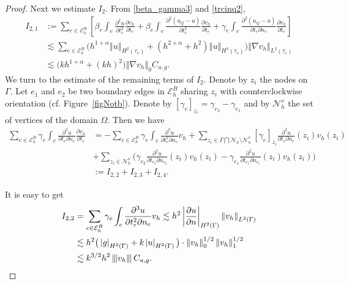 \documentclass[leqno,final]{siamltex}
\numberwithin{equation}{section}
\newcommand{\norm}[1]{\left\Vert#1\right\Vert}
\newcommand{\norme}[1]{\left\Vert{\hskip -2.7pt}\left\vert #1 \right\vert{\hskip -2.7pt}\right\Vert}
\newcommand{\abs}[1]{\left\vert#1\right\vert}
\newcommand{\jm}[1]{\left[#1\right]}
\newcommand{\nn}{\nonumber}
\newcommand{\ls}{\lesssim}
\newcommand{\al}{\alpha}
\newcommand{\be}{\beta}
\newcommand{\ga}{\gamma}
\newcommand{\Ga}{\Gamma}
\newcommand{\na}{\nabla}
\newcommand{\Om}{\Omega}
\newcommand{\pa}{\partial}
\newcommand{\N}{\mathcal{N}}
\newcommand{\E}{\mathcal{E}}
\newcommand{\eq}[1]{\begin{align}#1\end{align}}
\begin{document}
\begin{proof}
Next we estimate $I_2$. From \eqref{beta_gamma3} and \eqref{trcinq2},
\eq{
I_{2,1} &:= \sum_{e\in\E_h^B} \left[ \be_e\int_e\frac{\pa^2 u}{\pa t_e^2}\frac{\pa v_h}{\pa t_e} + \be_e\int_e\frac{\pa^2 (u_Q-u)}{\pa t_e^2}\frac{\pa v_h}{\pa t_e} + \ga_e \int_e\frac{\pa^2 (u_Q-u)}{\pa t_e \pa n_e}\frac{\pa v_h}{\pa t_e}\right]\label{part1_I2}\\
&\ls \sum_{e\in\E_h^B} \big( h^{1+\al}\norm{u}_{H^2(\tau_e)}+(h^{2+\al}+h^2)\norm{u}_{H^3(\tau_e)} \big) \norm{\na v_h}_{L^2(\tau_e)}\nn\\
&\ls \big( kh^{1+\al}+(kh)^{2} \big)\norm{\na v_h}_0  C_{u,g}.\nn
}
We turn to the estimate of the remaining terms of $I_2$. Denote by $z_i$ the nodes on $\Ga$. Let $e_1$ and $e_2$ be two boundary edges in $\E_h^B$ sharing $z_i$ with counterclockwise orientation (cf. Figure~\ref{figNotb}). Denote by $\jm{\ga_e}_{z_i}=\ga_{e_2}-\ga_{e_1}$ and by $\N_h^v$ the set of vertices of the domain $\Om$. Then we have
\eq{
\sum_{e\in\E_h^B}\ga_e\int_e\frac{\pa^2 u}{\pa t_e \pa n_e}\frac{\pa v_h}{\pa t_e} &=  -  \sum_{e\in\E_h^B}\ga_e\int_e\frac{\pa^3 u}{\pa t_e^2 \pa n_e}v_h + \sum_{z_i\in\Ga\bigcap\N_h\setminus\N_h^v} \jm{\ga_e}_{z_i} \frac{\pa^2 u}{\pa t_e \pa n_e}(z_i) v_h(z_i) \label{part20_I2} \\
& + \sum_{z_i\in\N_h^v} \bigg( \ga_{e_2} \frac{\pa^2 u}{\pa t_{e_2} \pa n_{e_2}}(z_i) v_h(z_i) - \ga_{e_1} \frac{\pa^2 u}{\pa t_{e_1} \pa n_{e_1}}(z_i) v_h(z_i) \bigg)\nn\\
&:= I_{2,2} + I_{2,3} + I_{2,4}.\nn
}

It is easy to get
\eq{
I_{2,2} &= \sum_{e\in\E_h^B}\ga_e\int_e\frac{\pa^3 u}{\pa t_e^2 \pa n_e}v_h \ls h^2 \abs{\frac{\pa u}{\pa n}}_{H^2(\Ga)} \norm{v_h}_{L^2(\Ga)}\label{part22_I2}\\
& \ls h^2 \big(  \abs{g}_{H^2(\Ga)} + k \abs{u}_{H^2(\Ga)} \big) \cdot \norm{v_h}_0^{1/2} \norm{v_h}_1^{1/2} \nn\\
& \ls k^{3/2} h^2  \norme{v_h} C_{u,g}. \nn
}


\end{proof}
\end{document}
